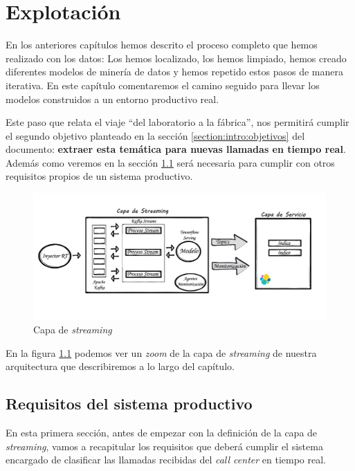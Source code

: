 \chapter{Explotación}
\label{chapter:prod}

En los anteriores capítulos hemos descrito el proceso completo que hemos realizado con los datos: Los hemos localizado, los hemos limpiado, hemos creado diferentes modelos de minería de datos y hemos repetido estos pasos de manera iterativa. En este capítulo comentaremos el camino seguido para llevar los modelos construidos a un entorno productivo real.

Este paso que relata el viaje ``del laboratorio a la fábrica'', nos permitirá  cumplir el segundo objetivo planteado en la sección \ref{section:intro:objetivos} del documento: \textbf{extraer esta temática para nuevas llamadas en tiempo real}. Además como veremos en la sección \ref{section:prod:req} será necesaria para cumplir con otros requisitos propios de un sistema productivo.

\begin{figure}[!ht]
	\centering
	\includegraphics[width=1\textwidth]{images/exp/streaminglayer_v1}
	\caption{Capa de \textit{streaming}}
	\label{fig:streamlayer}
\end{figure}


En la figura \ref{fig:streamlayer} podemos ver un \textit{zoom} de la capa de \textit{streaming} de nuestra arquitectura que describiremos a lo largo del capítulo. 



\section{Requisitos del sistema productivo}
\label{section:prod:req}

En esta primera sección, antes de empezar con la definición de la capa de \textit{streaming}, vamos a recapitular los requisitos que deberá cumplir el sistema encargado de clasificar las llamadas recibidas del \textit{call center} en tiempo real. 

